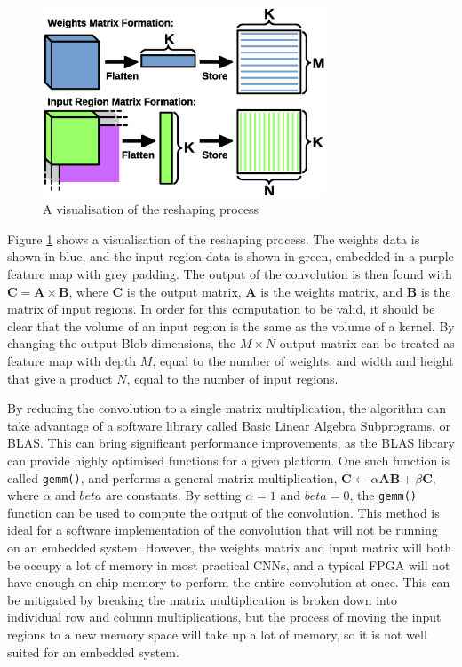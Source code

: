 \documentclass[12pt]{article}
\begin{document}
\begin{figure}[h]
\centering
\includegraphics[width=0.75\textwidth]{figures/im2col.eps}
\caption{A visualisation of the reshaping process} 
\label{fig:im2col}
\end{figure}

Figure \ref{fig:im2col} shows a visualisation of the reshaping process. The weights data is shown in blue, and the input region data is shown in green, embedded in a purple feature map with grey padding. The output of the convolution is then found with \( \mathbf{C} = \mathbf{A}\times\mathbf{B}\), where $\mathbf{C}$ is the output matrix, $\mathbf{A}$ is the weights matrix, and $\mathbf{B}$ is the matrix of input regions. In order for this computation to be valid, it should be clear that the volume of an input region is the same as the volume of a kernel. By changing the output Blob dimensions, the $M \times N$ output matrix can be treated as feature map with depth $M$, equal to the number of weights, and width and height that give a product $N$, equal to the number of input regions.

By reducing the convolution to a single matrix multiplication, the algorithm can take advantage of a software library called Basic Linear Algebra Subprograms, or BLAS. This can bring significant performance improvements, as the BLAS library can provide highly optimised functions for a given platform. One such function is called \lstinline|gemm()|, and performs a general matrix multiplication, $\mathbf{C} \gets \alpha\mathbf{A}\mathbf{B} + \beta\mathbf{C}$, where $\alpha$ and $beta$ are constants. By setting $\alpha = 1$ and $beta = 0$, the \lstinline|gemm()| function can be used to compute the output of the convolution. This method is ideal for a software implementation of the convolution that will not be running on an embedded system. However, the weights matrix and input matrix will both be occupy a lot of memory in most practical CNNs, and a typical FPGA will not have enough on-chip memory to perform the entire convolution at once. This can be mitigated by breaking the matrix multiplication is broken down into individual row and column multiplications, but the process of moving the input regions to a new memory space will take up a lot of memory, so it is not well suited for an embedded system.
\end{document}
